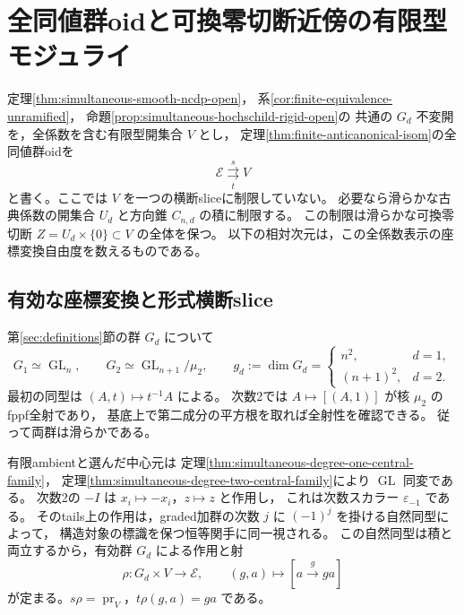 \section{全同値群oidと可換零切断近傍の有限型モジュライ}
\label{sec:finite-moduli}
\label{sec:source-near-commutative-zero}

定理\ref{thm:simultaneous-smooth-ncdp-open}，
系\ref{cor:finite-equivalence-unramified}，
命題\ref{prop:simultaneous-hochschild-rigid-open}の
共通の $G_d$ 不変開を，全係数を含む有限型開集合 $V$ とし，
定理\ref{thm:finite-anticanonical-isom}の全同値群oidを
\[
 \mathcal E\underset{t}{\overset{s}{\rightrightarrows}}V
\]
と書く。ここでは $V$ を一つの横断sliceに制限していない。
必要なら滑らかな古典係数の開集合 $U_d$ と方向錐 $C_{n,d}$ の積に制限する。
この制限は滑らかな可換零切断
$Z=U_d\times\{0\}\subset V$ の全体を保つ。
以下の相対次元は，この全係数表示の座標変換自由度を数えるものである。

\subsection{有効な座標変換と形式横断slice}

第\ref{sec:definitions}節の群 $G_d$ について
\[
 G_1\simeq\operatorname{GL}_n,
 \qquad
 G_2\simeq\operatorname{GL}_{n+1}/\mu_2,
 \qquad
 g_d:=\dim G_d=
 \begin{cases}n^2,&d=1,\\(n+1)^2,&d=2.\end{cases}
\]
最初の同型は $(A,t)\mapsto t^{-1}A$ による。
次数2では $A\mapsto[(A,1)]$ が核 $\mu_2$ のfppf全射であり，
基底上で第二成分の平方根を取れば全射性を確認できる。
従って両群は滑らかである。

有限ambientと選んだ中心元は
定理\ref{thm:simultaneous-degree-one-central-family}，
定理\ref{thm:simultaneous-degree-two-central-family}により
$\operatorname{GL}$ 同変である。
次数2の $-I$ は $x_i\mapsto-x_i$，$z\mapsto z$ と作用し，
これは次数スカラー $\varepsilon_{-1}$ である。
そのtails上の作用は，graded加群の次数 $j$ に $(-1)^j$ を掛ける自然同型によって，
構造対象の標識を保つ恒等関手に同一視される。
この自然同型は積と両立するから，有効群 $G_d$ による作用と射
\begin{equation}\label{eq:coordinate-action-to-equivalences}
 \rho:G_d\times V\longrightarrow\mathcal E,
 \qquad(g,a)\longmapsto[a\xrightarrow{\ g\ }ga]
\end{equation}
が定まる。$s\rho=\operatorname{pr}_V$，$t\rho(g,a)=ga$ である。

